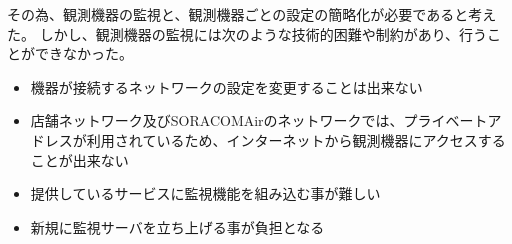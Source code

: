 その為、観測機器の監視と、観測機器ごとの設定の簡略化が必要であると考えた。
しかし、観測機器の監視には次のような技術的困難や制約があり、行うことができなかった。
\begin{itemize}
\item 機器が接続するネットワークの設定を変更することは出来ない
\item 店舗ネットワーク及びSORACOMAirのネットワークでは、プライベートアドレスが利用されているため、インターネットから観測機器にアクセスすることが出来ない
\item 提供しているサービスに監視機能を組み込む事が難しい
\item 新規に監視サーバを立ち上げる事が負担となる
\end{itemize}

